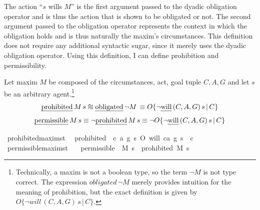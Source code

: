 \begin{isabellebody}
\begin{isamarkuptext}
The action ``$s$ wills $M$'' is the first argument passed to the dyadic obligation operator and is 
thus the action that is shown to be obligated or not. The second argument passed to the obligation 
operator represents the context in which the obligation holds and is thus naturally the maxim's circumstances.
This definition does not require any additional syntactic sugar, since it merely uses the dyadic obligation
operator. Using this definition, I can define prohibition and permissibility.

\begin{definition} Let maxim $M$ be composed of the circumstances, act, 
goal tuple $C, A, G$ and let $s$ be an arbitrary agent.\footnote{Technically, a maxim is not a boolean 
type, so the term $\neg M$ is not type correct. The expression $obligated \, \neg M$ merely provides 
intuition for the meaning of prohibition, but the exact definition is given by 
$O\{ \neg will \, (C, A, G) \, s \, | \, C\}$.}
\newcommand*{\approxident}{%
  \mathrel{\vcenter{\offinterlineskip
  \hbox{$\sim$}\vskip-.35ex\hbox{$\sim$}\vskip-.35ex\hbox{$\sim$}}}}
$$\text{\emph{prohibited}} \, M \, s \approxident \text{\emph{obligated}} \, \neg M \, \equiv O\{ \neg \text{\emph{will}} \, (C, A, G) \, s \, | \, C\}$$
$$\text{\emph{permissible}} \, M \, s \equiv \neg \text{\emph{prohibited}} \, M \, s \equiv \neg O\{ \neg \text{\emph{will}} \, (C, A, G) \, s \, | \, C\}$$
\end{definition}%
\end{isamarkuptext}\isamarkuptrue%
\isamarkupfalse%
\ prohibited{\isacharcolon}{\isacharcolon}{\isachardoublequoteopen}maxim{\isasymRightarrow}s{\isasymRightarrow}t{\isachardoublequoteclose}\ \ \isanewline
{\isachardoublequoteopen}prohibited\ {\isasymequiv}\ {\isasymlambda}{\isacharparenleft}c{\isacharcomma}\ a{\isacharcomma}\ g{\isacharparenright}\ s{\isachardot}\ O{\isacharbraceleft}\isactrlbold {\isasymnot}\ {\isacharparenleft}will\ {\isacharparenleft}c{\isacharcomma}a{\isacharcomma}\ g{\isacharparenright}\ s{\isacharparenright}\ {\isacharbar}\ c{\isacharbraceright}{\isachardoublequoteclose}\isanewline
%
\isanewline
\isanewline
{}\isamarkupfalse%
\ permissible{\isacharcolon}{\isacharcolon}{\isachardoublequoteopen}maxim{\isasymRightarrow}s{\isasymRightarrow}t{\isachardoublequoteclose}\isanewline
\ \ \ {\isachardoublequoteopen}permissible\ {\isasymequiv}\ {\isasymlambda}M\ s{\isachardot}\ \isactrlbold {\isasymnot}\ {\isacharparenleft}prohibited\ M\ s{\isacharparenright}{\isachardoublequoteclose}\isanewline

\end{isabellebody}
